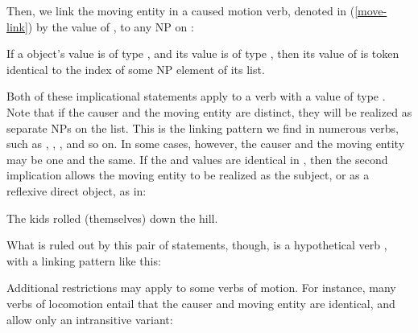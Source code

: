 \documentclass[output=paper
 	        ,biblatex
                ,babelshorthands
                ,newtxmath
                ,draftmode
                ,colorlinks, citecolor=brown
]{langscibook}
\begin{document}
Then, we link the moving entity in a caused motion verb, denoted in (\ref{move-link}) by the value of , to any NP on :

\ealnoraggedright
\ex If a  object's  value is of type , and its  value is of type , then its value of  is token identical to the index of some NP element of its  list.
\ex \label{move-link}
\zl

Both of these implicational statements apply to a verb with a  value of type .
Note that if the causer and the moving entity are distinct, they will be realized as separate NPs on the  list.
This is the linking pattern we find in numerous verbs, such as , , , and so on.
In some cases, however, the causer and the moving entity may be one and the same.
If the  and  values are identical in , then the second implication allows the moving entity to be realized as the subject, or as a reflexive direct object, as in:

\ea
\label{roll}
The kids rolled (themselves) down the hill.
\z

What is ruled out by this pair of statements, though, is a hypothetical verb , with a linking pattern like this:

\begin{exe}
\end{exe}

Additional restrictions may apply to some verbs of motion.
For instance, many verbs of locomotion entail that the causer and moving entity are identical, and allow only an intransitive variant:
\end{document}
